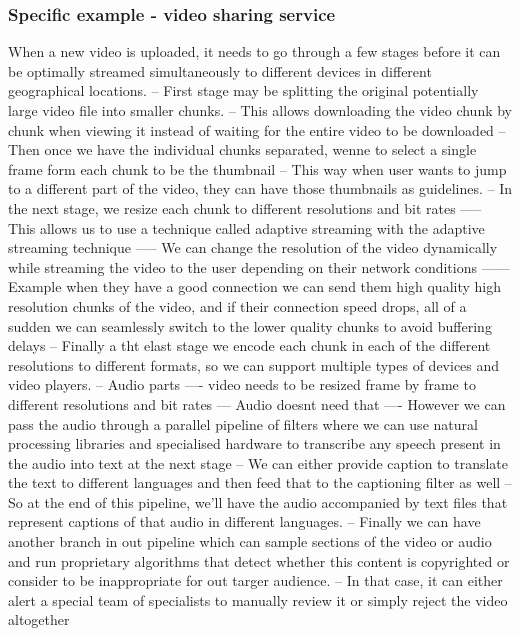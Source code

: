 \documentclass[a4paper, 11pt]{book}
\begin{document}
    \subsubsection{Specific example - video sharing service}
    When a new video is uploaded, it needs to go through a few stages before it can be optimally streamed simultaneously to different devices in different geographical locations.
    -- First stage may be splitting the original potentially large video file into smaller chunks.
    -- This allows downloading the video chunk by chunk when viewing it instead of waiting for the entire video to be downloaded
    -- Then once we have the individual chunks separated, wenne to select a single frame form each chunk to be the thumbnail
    -- This way when user wants to jump to a different part of the video, they can have those thumbnails as guidelines.
    -- In the next stage, we resize each chunk to different resolutions and bit rates
    ----- This allows us to use a technique called adaptive streaming with the adaptive streaming technique
    ----- We can change the resolution of the video dynamically while streaming the video to the user depending on their network conditions
    ------ Example when they have a good connection we can send them high quality high resolution chunks of the video, and if their connection speed drops, all of a sudden we can seamlessly switch to the lower quality chunks to avoid buffering delays
    -- Finally a tht elast stage we encode each chunk in each of the different resolutions to different formats, so we can support multiple types of devices and video players.
    -- Audio parts
    ---- video needs to be resized frame by frame to different resolutions and bit rates
    --- Audio doesnt need that
    ---- However we can pass the audio through a parallel pipeline of filters where we can use natural processing libraries and specialised hardware to transcribe any speech present in the audio into text at the next stage
    -- We can either provide caption to translate the text to different languages and then feed that to the captioning filter as well
    -- So at the end of this pipeline, we'll have the audio accompanied by text files that represent captions of that audio in different languages.
    -- Finally we can have another branch in out pipeline which can sample sections of the video or audio and run proprietary algorithms that detect whether this content is copyrighted or consider to be inappropriate for out targer audience.
    -- In that case, it can either alert a special team of specialists to manually review it or simply reject the video altogether
\end{document}
